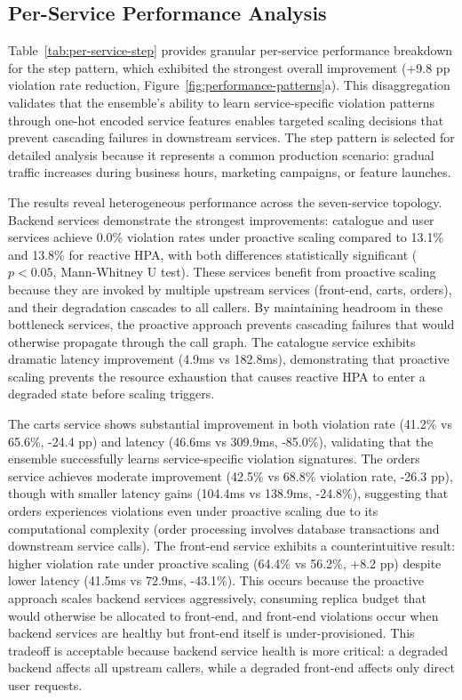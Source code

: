 \documentclass[conference]{IEEEtran}
\begin{document}

\subsection{Per-Service Performance Analysis}

Table~\ref{tab:per-service-step} provides granular per-service performance breakdown for the step pattern, which exhibited the strongest overall improvement (+9.8 pp violation rate reduction, Figure~\ref{fig:performance-patterns}a). This disaggregation validates that the ensemble's ability to learn service-specific violation patterns through one-hot encoded service features enables targeted scaling decisions that prevent cascading failures in downstream services. The step pattern is selected for detailed analysis because it represents a common production scenario: gradual traffic increases during business hours, marketing campaigns, or feature launches.

The results reveal heterogeneous performance across the seven-service topology. Backend services demonstrate the strongest improvements: catalogue and user services achieve 0.0\% violation rates under proactive scaling compared to 13.1\% and 13.8\% for reactive HPA, with both differences statistically significant ($p < 0.05$, Mann-Whitney U test). These services benefit from proactive scaling because they are invoked by multiple upstream services (front-end, carts, orders), and their degradation cascades to all callers. By maintaining headroom in these bottleneck services, the proactive approach prevents cascading failures that would otherwise propagate through the call graph. The catalogue service exhibits dramatic latency improvement (4.9ms vs 182.8ms), demonstrating that proactive scaling prevents the resource exhaustion that causes reactive HPA to enter a degraded state before scaling triggers.

The carts service shows substantial improvement in both violation rate (41.2\% vs 65.6\%, -24.4 pp) and latency (46.6ms vs 309.9ms, -85.0\%), validating that the ensemble successfully learns service-specific violation signatures. The orders service achieves moderate improvement (42.5\% vs 68.8\% violation rate, -26.3 pp), though with smaller latency gains (104.4ms vs 138.9ms, -24.8\%), suggesting that orders experiences violations even under proactive scaling due to its computational complexity (order processing involves database transactions and downstream service calls). The front-end service exhibits a counterintuitive result: higher violation rate under proactive scaling (64.4\% vs 56.2\%, +8.2 pp) despite lower latency (41.5ms vs 72.9ms, -43.1\%). This occurs because the proactive approach scales backend services aggressively, consuming replica budget that would otherwise be allocated to front-end, and front-end violations occur when backend services are healthy but front-end itself is under-provisioned. This tradeoff is acceptable because backend service health is more critical: a degraded backend affects all upstream callers, while a degraded front-end affects only direct user requests.
\end{document}

